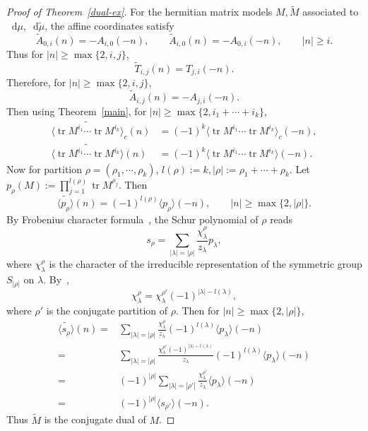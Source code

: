 \documentclass[a4paper]{article}
\theoremstyle{plain}
\theoremstyle{definition}
\newcommand{\dif}{\mathop{}\!\mathrm{d}}
\DeclareMathOperator{\tr}{tr}
\newcommand{\nn}{\nonumber}
\begin{document}
\begin{proof}[Proof of Theorem~\ref{dual-ex}]
	For the hermitian matrix models $M,\widetilde M$ associated to $\dif\mu,\dif\widetilde\mu$, the affine coordinates satisfy
	\begin{equation}
		\widetilde A_{0,i}(n)=-A_{i,0}(-n),\qquad\widetilde A_{i,0}(n)=-A_{0,i}(-n),\qquad |n|\ge i.
	\end{equation}
	Thus for $|n|\ge\max\{2,i,j\}$,
	\begin{equation}
		\widetilde T_{i,j}(n)=T_{j,i}(-n).
	\end{equation}
	Therefore, for $|n|\ge\max\{2,i,j\}$,
	\begin{equation}
		\widetilde A_{i,j}(n)=-A_{j,i}(-n).
	\end{equation}
	Then using Theorem~\ref{main}, for $|n|\ge\max\{2,i_1+\cdots+i_k\}$,
	\begin{align}
		\widetilde{\langle\tr M^{i_1}\cdots\tr M^{i_k}\rangle}_c(n)&=(-1)^k\langle\tr M^{i_1}\cdots\tr M^{i_k}\rangle_c(-n),\\
		\widetilde{\langle\tr M^{i_1}\cdots\tr M^{i_k}\rangle}(n)&=(-1)^k\langle\tr M^{i_1}\cdots\tr M^{i_k}\rangle(-n).
	\end{align}
	Now for partition $\rho=(\rho_1,\cdots,\rho_k)$, $l(\rho):=k,|\rho|:=\rho_1+\cdots+\rho_k$. Let $p_\rho(M):=\prod_{j=1}^{l(\rho)}\tr M^{\rho_j}$. Then
	\begin{equation}
		\widetilde{\langle p_\rho\rangle}(n) = (-1)^{l(\rho)}\langle p_\rho\rangle(-n),\qquad |n|\ge\max\{2,|\rho|\}.
	\end{equation}
	By Frobenius character formula~\cite[Section 1.7]{Schur}, the Schur polynomial of $\rho$ reads
	\begin{equation}
		s_\rho=\sum_{|\lambda|=|\rho|}\frac{\chi^\rho_\lambda}{z_\lambda} p_\lambda,
	\end{equation}
	where $\chi^\rho_\lambda$ is the character of the irreducible representation of the symmetric group $S_{|\rho|}$ on $\lambda$. By~\cite[Section 1.7]{Schur},
	\begin{equation}
		\chi_\lambda^\rho=\chi_\lambda^{\rho'}(-1)^{|\lambda|-l(\lambda)},
	\end{equation}
	where $\rho'$ is the conjugate partition of $\rho$. Then for $|n|\ge\max\{2,|\rho|\}$,
	\begin{align}
		\widetilde{\langle s_\rho\rangle}(n)=&\sum_{|\lambda|=|\rho|}\frac{\chi^\rho_\lambda}{z_\lambda} (-1)^{l(\lambda)}\langle p_\lambda\rangle(-n)\nn\\
		=&\sum_{|\lambda|=|\rho|}\frac{\chi^{\rho'}_\lambda (-1)^{|\lambda|-l(\lambda)}}{z_\lambda}(-1)^{l(\lambda)}\langle p_\lambda\rangle(-n)\nn\\
		=&(-1)^{|\rho|}\sum_{|\lambda|=|\rho'|}\frac{\chi^{\rho'}_\lambda}{z_\lambda}\langle p_\lambda\rangle(-n)\nn\\
		=&(-1)^{|\rho|}\langle s_{\rho'}\rangle(-n).
	\end{align}
	Thus $\widetilde M$ is the conjugate dual of $M$.
\end{proof}
\end{document}
